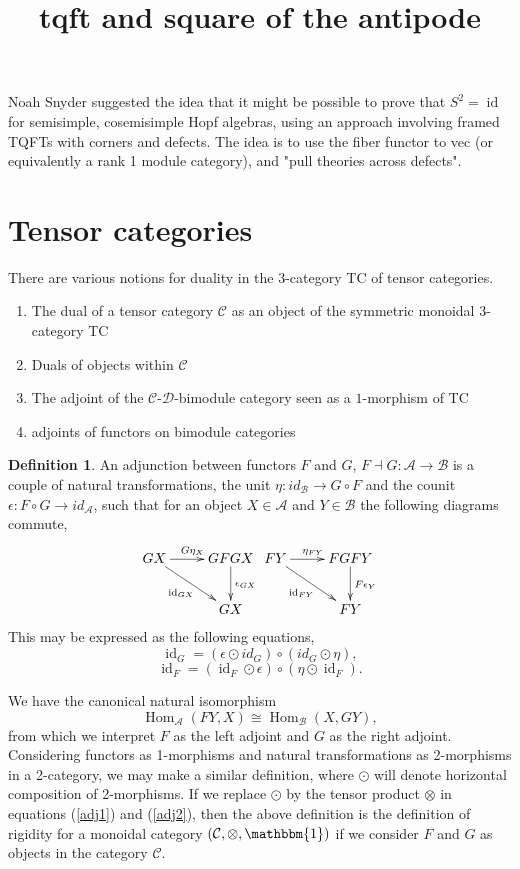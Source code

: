 \documentclass[12pt,a4paper,draft]{article}
\title{tqft and square of the antipode}
\theoremstyle{remark}
\theoremstyle{definition}
\newtheorem{Def}[theorem]{Definition}
\numberwithin{equation}{section}
\newcommand\id{\operatorname{id}}
\newcommand\one{\mathbbm{1}}
\newcommand\Hom{\operatorname{Hom}}
\newcommand \A{\mathcal A}
\newcommand \B{\mathcal B}
\newcommand \D{\mathcal D}
\newcommand \C{\mathcal C}
\begin{document}
Noah Snyder suggested the idea that it might be possible to prove that $S^2=\id$ for semisimple, cosemisimple Hopf algebras, using an approach involving framed TQFTs with corners and defects. The idea is to use the fiber functor to vec (or equivalently a rank 1 module category), and "pull theories across defects".

\section{Tensor categories}
There are various notions for duality in the 3-category TC of tensor categories. 
\begin{enumerate}
	\item The dual of a tensor category $\C$ as an object of the symmetric monoidal 3-category TC
	\item Duals of objects within $\C$
	\item The adjoint of the $\C$-$\D$-bimodule category seen as a $1$-morphism of TC
	\item adjoints of functors on bimodule categories
\end{enumerate}
\begin{Def}
An adjunction between functors $F$ and $G$, $F  \dashv G: \A \rightarrow \B$ is a couple of natural transformations, the unit $\eta: id_{\B} \rightarrow G\circ F$ and the counit $\epsilon: F \circ G \rightarrow id_{\A} $, such that for an object $ X\in \A$ and $Y \in \B$ the following diagrams commute, 
\begin{equation} 
\xymatrix{
GX \ar[r]^{G\eta_{X} }\ar[rd]_{\id_{GX}} & GFGX \ar[d]^{\epsilon_{GX}} \\
 & GX
}	
\xymatrix{
FY \ar[r]^{\eta_{FY}}\ar[rd]_{\id_{FY}} & FGFY \ar[d]^{F\epsilon_{Y}} \\
 & FY
}
\end{equation}
This may be expressed as the following equations, \begin{equation}\label{adj1}
	\id_G = (\epsilon \odot id_G)\circ(id_G \odot \eta),
\end{equation}
\begin{equation}\label{adj2}
	\id_F = (\id_F\odot \epsilon) \circ (\eta \odot \id_F).
\end{equation}
\end{Def}

We have the canonical natural isomorphism \begin{equation}
\Hom_\A (FY, X) \cong \Hom_\B (X, GY),
\end{equation}
from which we interpret $F$ as the left adjoint and $G$ as the right adjoint.
Considering functors as 1-morphisms and natural transformations as 2-morphisms in a 2-category, we may make a similar definition, where $\odot$ will denote horizontal composition of 2-morphisms.
If we replace $\odot$ by the tensor product $\otimes$ in equations (\ref{adj1}) and (\ref{adj2}), then the above definition is the definition of rigidity for a monoidal category $(\C, \otimes, \one)$ if we consider $F$ and $G$ as objects in the category $\C$. 
\end{document}
